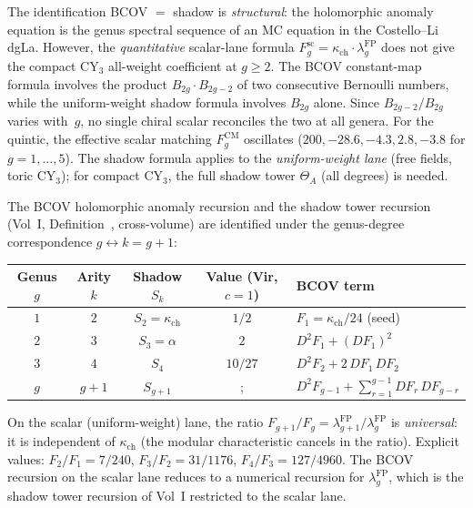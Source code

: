 \begin{remark}
\label{rem:bcov-vs-shadow}
The identification BCOV $=$ shadow is \emph{structural}: the holomorphic anomaly equation is the genus spectral sequence of an MC equation in the Costello--Li dgLa. However, the \emph{quantitative} scalar-lane formula $F_g^{\mathrm{sc}} = \kappa_{\mathrm{ch}} \cdot \lambda_g^{\mathrm{FP}}$ does not give the compact CY$_3$ all-weight coefficient at $g \geq 2$. The BCOV constant-map formula involves the product $B_{2g} \cdot B_{2g-2}$ of two consecutive Bernoulli numbers, while the uniform-weight shadow formula involves $B_{2g}$ alone. Since $B_{2g-2}/B_{2g}$ varies with~$g$, no single chiral scalar reconciles the two at all genera. For the quintic, the effective scalar matching $F_g^{\mathrm{CM}}$ oscillates ($200, -28.6, -4.3, 2.8, -3.8$ for $g = 1, \ldots, 5$). The shadow formula applies to the \emph{uniform-weight lane} (free fields, toric CY$_3$); for compact CY$_3$, the full shadow tower $\Theta_A$ (all degrees) is needed.
\end{remark}

\begin{proposition}[BCOV recursion \texorpdfstring{$=$}{=} shadow tower recursion on the scalar lane]
\label{prop:bcov-shadow-recursion}
The BCOV holomorphic anomaly recursion and the shadow tower recursion (Vol~I, Definition~\cite{VolI}, cross-volume) are identified under the genus-degree correspondence $g \leftrightarrow k = g + 1$:
\begin{center}
\small
\renewcommand{\arraystretch}{1.15}
\begin{tabular}{ccccl}
\toprule
\textbf{Genus $g$} & \textbf{Arity $k$} & \textbf{Shadow $S_k$} & \textbf{Value (Vir, $c=1$)} & \textbf{BCOV term} \\
\midrule
$1$ & $2$ & $S_2 = \kappa_{\mathrm{ch}}$ & $1/2$ & $F_1 = \kappa_{\mathrm{ch}}/24$ (seed) \\
$2$ & $3$ & $S_3 = \alpha$ & $2$ & $D^2 F_1 + (DF_1)^2$ \\
$3$ & $4$ & $S_4$ & $10/27$ & $D^2 F_2 + 2\,DF_1\, DF_2$ \\
$g$ & $g{+}1$ & $S_{g+1}$ &; & $D^2 F_{g-1} + \textstyle\sum_{r=1}^{g-1} DF_r\, DF_{g-r}$ \\
\bottomrule
\end{tabular}
\end{center}
On the scalar (uniform-weight) lane, the ratio $F_{g+1}/F_g = \lambda_{g+1}^{\mathrm{FP}}/\lambda_g^{\mathrm{FP}}$ is \emph{universal}: it is independent of $\kappa_{\mathrm{ch}}$ (the modular characteristic cancels in the ratio). Explicit values: $F_2/F_1 = 7/240$, $F_3/F_2 = 31/1176$, $F_4/F_3 = 127/4960$. The BCOV recursion on the scalar lane reduces to a numerical recursion for $\lambda_g^{\mathrm{FP}}$, which is the shadow tower recursion of Vol~I restricted to the scalar lane.
\end{proposition}

